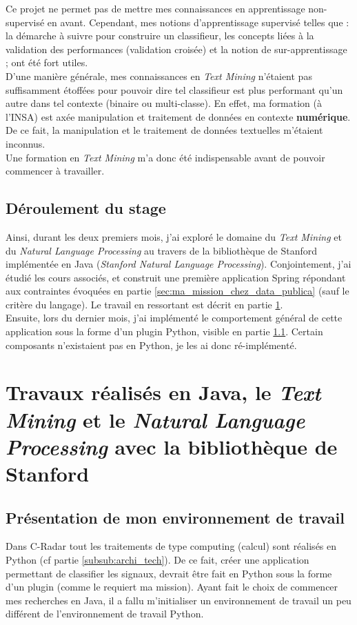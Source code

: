         Ce projet ne permet pas de mettre mes connaissances en apprentissage non-supervisé en avant. Cependant, mes notions d'apprentissage supervisé telles que : la démarche à suivre pour construire un classifieur, les concepts liées à la validation des performances (validation croisée) et la notion de sur-apprentissage ; ont été fort utiles.\\

        D'une manière générale, mes connaissances en \textit{Text Mining} n'étaient pas suffisamment étoffées pour pouvoir dire tel classifieur est plus performant qu'un autre dans tel contexte (binaire ou multi-classe). En effet, ma formation (à l'INSA) est axée manipulation et traitement de données en contexte \textbf{numérique}. De ce fait, la manipulation et le traitement de données textuelles m'étaient inconnus.\\

        Une formation en \textit{Text Mining} m'a donc été indispensable avant de pouvoir commencer à travailler.

    \subsection{Déroulement du stage}
        Ainsi, durant les deux premiers mois, j'ai exploré le domaine du \textit{Text Mining} et du \textit{Natural Language Processing} au travers de la bibliothèque de Stanford implémentée en Java (\textit{Stanford Natural Language Processing}). Conjointement, j'ai étudié les cours associés, et construit une première application Spring répondant aux contraintes évoquées en partie \ref{sec:ma_mission_chez_data_publica} (sauf le critère du langage). Le travail en ressortant est décrit en partie \ref{sec:travaux_realises_en_java}.\\

        Ensuite, lors du dernier mois, j’ai implémenté le comportement général de cette application sous la forme d’un plugin Python, visible en partie \ref{}. Certain composants n'existaient pas en Python, je les ai donc ré-implémenté.

\section{Travaux réalisés en Java, le \textit{Text Mining} et le \textit{Natural Language Processing} avec la bibliothèque de Stanford}
\label{sec:travaux_realises_en_java}
    \subsection{Présentation de mon environnement de travail}
        Dans C-Radar tout les traitements de type \og computing \fg (calcul) sont réalisés en Python (cf partie \ref{subsub:archi_tech}). De ce fait, créer une application permettant de classifier les signaux, devrait être fait en Python sous la forme d'un plugin (comme le requiert ma mission). Ayant fait le choix de commencer mes recherches en Java, il a fallu m'initialiser un environnement de travail un peu différent de l'environnement de travail Python.

